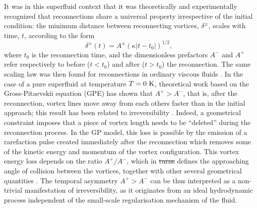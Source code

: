 \documentclass[9pt,twocolumn,twoside]{pnas-new}
\providecommand{\DIFadd}[1]{{\protect\color{blue}\uwave{#1}}} %
\providecommand{\DIFdel}[1]{{\protect\color{red}\sout{#1}}} %
\providecommand{\DIFaddbegin}{} %
\providecommand{\DIFaddend}{} %
\providecommand{\DIFdelbegin}{} %
\providecommand{\DIFdelend}{} %
\newcommand{\DIFscaledelfig}{0.5}
\newlength{\DIFdelgraphicswidth} %
\newlength{\DIFdelgraphicsheight} %
\newcommand{\DIFaddincludegraphics}[2][]{{\color{blue}\fbox{\DIFOincludegraphics[#1]{#2}}}} %
\newcommand{\DIFdelincludegraphics}[2][]{%
\sbox{\DIFdelgraphicsbox}{\DIFOincludegraphics[#1]{#2}}%
\settoboxwidth{\DIFdelgraphicswidth}{\DIFdelgraphicsbox} %
\settoboxtotalheight{\DIFdelgraphicsheight}{\DIFdelgraphicsbox} %
\scalebox{\DIFscaledelfig}{%
\parbox[b]{\DIFdelgraphicswidth}{\usebox{\DIFdelgraphicsbox}\\[-\baselineskip] \rule{\DIFdelgraphicswidth}{0em}}\llap{\resizebox{\DIFdelgraphicswidth}{\DIFdelgraphicsheight}{%
\setlength{\unitlength}{\DIFdelgraphicswidth}%
\begin{picture}(1,1)%
\thicklines\linethickness{2pt} %
{\color[rgb]{1,0,0}\put(0,0){\framebox(1,1){}}}%
{\color[rgb]{1,0,0}\put(0,0){\line( 1,1){1}}}%
{\color[rgb]{1,0,0}\put(0,1){\line(1,-1){1}}}%
\end{picture}%
}\hspace*{3pt}}} %
} %
\DeclareRobustCommand{\DIFaddbegin}{\DIFOaddbegin \let\includegraphics\DIFaddincludegraphics} %
\DeclareRobustCommand{\DIFaddend}{\DIFOaddend \let\includegraphics\DIFOincludegraphics} %
\DeclareRobustCommand{\DIFdelbegin}{\DIFOdelbegin \let\includegraphics\DIFdelincludegraphics} %
\DeclareRobustCommand{\DIFdelend}{\DIFOaddend \let\includegraphics\DIFOincludegraphics} %
\begin{document}
It was in this superfluid context that it was theoretically and experimentally recognized
\cite{nazarenko2003,bewley2008,paoletti2010,zuccherQuantumVortexReconnections2012a,villoisUniversalNonuniversalAspects2017a,galantucciCrossoverInteractionDriven2019a,tylutki2021universal}
that reconnections share a universal property irrespective of the initial
condition: the minimum distance between reconnecting 
vortices, $\delta^{\pm}$, scales with time, $t$, according to the form
\begin{equation}
\label{eq:scaling}
	\delta^{\pm}(t) = A^{\pm} (\kappa|t-t_0|)^{1/2},
\end{equation} 
\noindent
where $t_0$ is the reconnection time, and the dimensionless
prefactors $A^-$ and $A^+$ refer respectively to before
($t<t_0$) and after ($t>t_0$) the reconnection. The same scaling law
was then found for reconnections in ordinary viscous fluids 
\cite{yaoSeparationScalingViscous2020}. In the case of a pure
superfluid at temperature $T=0~\rm K$, theoretical work based on
the Gross-Pitaevskii equation (GPE) has shown that
$A^+>A^-$, that is, after the reconnection, vortex lines move away from 
each others faster than in the initial approach; this result has been
related to irreversibility \cite{villoisIrreversibleDynamicsVortex2020,promentMatchingTheoryCharacterize2020}. Indeed, a geometrical constraint imposes 
\cite{promentMatchingTheoryCharacterize2020}
that a piece of vortex length needs to be ``deleted'' 
during the reconnection process. In the GP model, this loss is possible 
by the emission of a rarefaction pulse created immediately after 
the reconnection
\cite{leadbeaterSoundEmissionDue2001b,zuccherQuantumVortexReconnections2012a} which removes some of the kinetic energy and momentum of the vortex configuration.
This vortex energy loss depends on
the ratio $A^+/A^-$, which in \DIFdelbegin \DIFdel{turns }\DIFdelend \DIFaddbegin \DIFadd{turn }\DIFaddend defines the approaching angle of collision
between the vortices, together with other several geometrical quantities \cite{villoisUniversalNonuniversalAspects2017a,promentMatchingTheoryCharacterize2020}. 
The temporal asymmetry $A^+>A^-$ can be thus interpreted as a non-trivial manifestation of irreversibility, as it originates from an ideal hydrodynamic process independent of the small-scale regularisation mechanism of the fluid.
\end{document}
